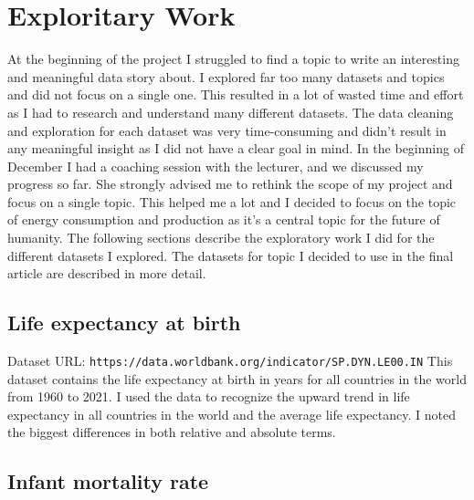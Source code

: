 \documentclass{article}
\begin{document}
\newpage

\section{Exploritary Work}

At the beginning of the project I struggled to find a topic to write an interesting and meaningful data story about.
I explored far too many datasets and topics and did not focus on a single one.
This resulted in a lot of wasted time and effort as I had to research and understand many different datasets.
The data cleaning and exploration for each dataset was very time-consuming and didn't result in any meaningful insight as I did not have a clear goal in mind. \newline
In the beginning of December I had a coaching session with the lecturer, and we discussed my progress so far.
She strongly advised me to rethink the scope of my project and focus on a single topic.
This helped me a lot and I decided to focus on the topic of energy consumption and production as it's a central topic for the future of humanity. \newline
The following sections describe the exploratory work I did for the different datasets I explored.
The datasets for topic I decided to use in the final article are described in more detail.

\subsection{Life expectancy at birth}

Dataset URL: \texttt{https://data.worldbank.org/indicator/SP.DYN.LE00.IN} \newline
This dataset contains the life expectancy at birth in years for all countries in the world from 1960 to 2021.
I used the data to recognize the upward trend in life expectancy in all countries in the world and the average life expectancy.
I noted the biggest differences in both relative and absolute terms. 

\subsection{Infant mortality rate}
\end{document}
